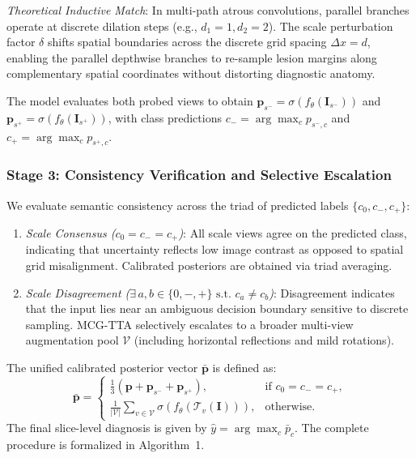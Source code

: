 \documentclass[journal]{IEEEtran}
\begin{document}
\emph{Theoretical Inductive Match}: In multi-path atrous convolutions, parallel branches operate at discrete dilation steps (e.g., $d_1 = 1, d_2 = 2$). The scale perturbation factor $\delta$ shifts spatial boundaries across the discrete grid spacing $\Delta x = d$, enabling the parallel depthwise branches to re-sample lesion margins along complementary spatial coordinates without distorting diagnostic anatomy.

The model evaluates both probed views to obtain $\mathbf{p}_{s^-} = \sigma(f_\theta(\mathbf{I}_{s^-}))$ and $\mathbf{p}_{s^+} = \sigma(f_\theta(\mathbf{I}_{s^+}))$, with class predictions $c_- = \arg\max_c p_{s^-, c}$ and $c_+ = \arg\max_c p_{s^+, c}$.

\subsubsection{Stage 3: Consistency Verification and Selective Escalation}
We evaluate semantic consistency across the triad of predicted labels $\{c_0, c_-, c_+\}$:
\begin{enumerate}
\item \emph{Scale Consensus ($c_0 = c_- = c_+$)}: All scale views agree on the predicted class, indicating that uncertainty reflects low image contrast as opposed to spatial grid misalignment. Calibrated posteriors are obtained via triad averaging.
\item \emph{Scale Disagreement ($\exists \, a, b \in \{0, -, +\} \text{ s.t. } c_a \ne c_b$)}: Disagreement indicates that the input lies near an ambiguous decision boundary sensitive to discrete sampling. MCG-TTA selectively escalates to a broader multi-view augmentation pool $\mathcal{V}$ (including horizontal reflections and mild rotations).
\end{enumerate}

The unified calibrated posterior vector $\bar{\mathbf{p}}$ is defined as:
\begin{equation}
\bar{\mathbf{p}} = \begin{cases}
\frac{1}{3}\left(\mathbf{p} + \mathbf{p}_{s^-} + \mathbf{p}_{s^+}\right), & \text{if } c_0 = c_- = c_+, \\[1.2ex]
\frac{1}{|\mathcal{V}|} \sum_{v \in \mathcal{V}} \sigma\left(f_\theta(\mathcal{T}_v(\mathbf{I}))\right), & \text{otherwise.}
\end{cases}
\label{eq:mcg_aggregation}
\end{equation}
The final slice-level diagnosis is given by $\hat{y} = \arg\max_c \bar{p}_c$. The complete procedure is formalized in Algorithm~1.
\end{document}
